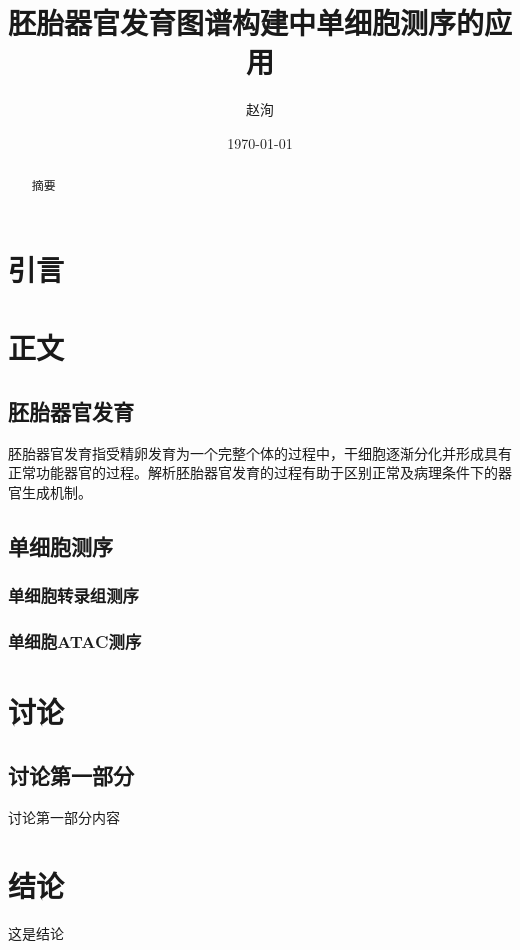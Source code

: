 \documentclass[lang=cn]{elegantpaper}
\title{胚胎器官发育图谱构建中单细胞测序的应用}
\author{赵洵}
\institute{中国科学院大学}
\date{\today}
\begin{document}
    \maketitle

    \renewcommand{\abstractname}{摘要}
    \begin{abstract}
        摘要
    \end{abstract}

	\section{引言}

    \section{正文}
		\subsection{胚胎器官发育}
        胚胎器官发育指受精卵发育为一个完整个体的过程中，干细胞逐渐分化并形成具有正常功能器官的过程。解析胚胎器官发育的过程有助于区别正常及病理条件下的器官生成机制\nocite{belle_tridimensional_2017}。
        \subsection{单细胞测序}
            \subsubsection{单细胞转录组测序}
            \subsubsection{单细胞ATAC测序}
	\section{讨论}
        \subsection{讨论第一部分}
            讨论第一部分内容
	\section{结论}
        这是结论\nocite{*}
    
\end{document}
